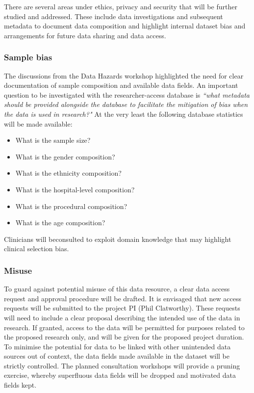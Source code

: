 \documentclass{article}
\begin{document}
There are several areas under ethics, privacy and security that will
be further studied and addressed. These include data investigations
and subsequent metadata to document data composition and highlight
internal dataset bias and arrangements for future data sharing and data access.

\subsubsection{Sample bias}
The discussions from the Data Hazards workshop highlighted the need
for clear documentation of sample composition and available data
fields. An important question to be investigated with the
researcher-access database is \textit{``what metadata should be provided
  alongside the database to facilitate the mitigation of bias when the
  data is used in research?"} At the very least the following
database statistics will be made available:
\begin{itemize}
\item What is the sample size?
\item What is the gender composition?
\item What is the ethnicity composition?
\item What is the hospital-level composition?
\item What is the procedural composition?
\item What is the age composition?
\end{itemize}

\noindent Clinicians will beconsulted to exploit domain knowledge that may highlight clinical
selection bias.


\subsubsection{Misuse}

To guard against potential misuse of this data resource, a clear data
access request and approval procedure will be drafted. It is envisaged
that new access requests will be submitted to the project PI (Phil
Clatworthy). These requests will need to include a clear proposal
describing the intended use of the data in research. If granted, access to the
data will be permitted for purposes related to the proposed research
only, and will be given for the proposed project duration.\\

To minimise the potential for data to be linked with other unintended data
sources out of context, the data fields made available in the dataset
will be strictly controlled. The planned consultation workshops will
provide a pruning exercise, whereby superfluous data fields will be
dropped and motivated data fields kept. \\
\end{document}
